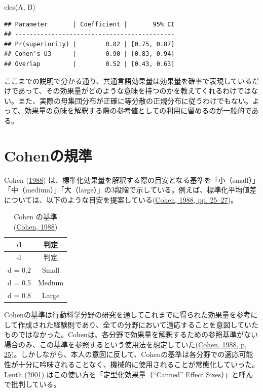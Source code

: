 \documentclass[
  ja=standard, xelatex, base=12pt]{bxjsreport}
\newenvironment{Shaded}{\begin{snugshade}}{\end{snugshade}}
\newcommand{\FunctionTok}[1]{\textcolor[rgb]{0.00,0.00,0.00}{#1}}
\newcommand{\NormalTok}[1]{#1}
\begin{document}
\begin{Shaded}
\begin{Highlighting}[]
\FunctionTok{cles}\NormalTok{(A, B)}
\end{Highlighting}
\end{Shaded}

\begin{verbatim}
## Parameter       | Coefficient |       95% CI
## --------------------------------------------
## Pr(superiority) |        0.82 | [0.75, 0.87]
## Cohen's U3      |        0.90 | [0.83, 0.94]
## Overlap         |        0.52 | [0.43, 0.63]
\end{verbatim}

ここまでの説明で分かる通り、共通言語効果量は効果量を確率で表現しているだけであって、その効果量がどのような意味を持つのかを教えてくれるわけではない。また、実際の母集団分布が正確に等分散の正規分布に従うわけでもない。よって、効果量の意味を解釈する際の参考値としての利用に留めるのが一般的である。

\hypertarget{cohenux306eux898fux6e96}{%
\section{Cohenの規準}\label{cohenux306eux898fux6e96}}

Cohen (\protect\hyperlink{ref-cohen1988}{1988}) は、標準化効果量を解釈する際の目安となる基準を「小（small）」「中（medium）」「大（large）」の3段階で示している。例えば、標準化平均値差については、以下のような目安を提案している(\protect\hyperlink{ref-cohen1988}{Cohen, 1988, pp. 25--27})。

\begin{longtable}[]{@{}cc@{}}
\caption{Cohen の基準 (\protect\hyperlink{ref-cohen1988}{Cohen, 1988})}\tabularnewline
\toprule
d & 判定 \\
\midrule
\endfirsthead
\toprule
d & 判定 \\
\midrule
\endhead
d = 0.2 & Small \\
d = 0.5 & Medium \\
d = 0.8 & Large \\
\bottomrule
\end{longtable}

Cohenの基準は行動科学分野の研究を通してこれまでに得られた効果量を参考にして作成された経験則であり、全ての分野において適応することを意図していたものではなかった。Cohenは、各分野で効果量を解釈するための参照基準がない場合のみ、この基準を参照するという使用法を想定していた(\protect\hyperlink{ref-cohen1988}{Cohen, 1988, p. 25})。しかしながら、本人の意図に反して、Cohenの基準は各分野での適応可能性が十分に吟味されることなく、機械的に使用されることが常態化していった。Lenth (\protect\hyperlink{ref-lenth2001}{2001}) はこの使い方を「定型化効果量（``Canned'' Effect Sizes）」と呼んで批判している。
\end{document}
